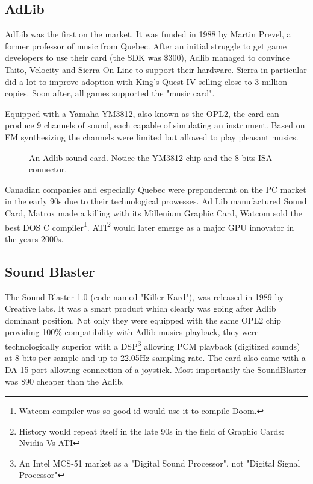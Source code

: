 \documentclass[book.tex]{subfiles}
\begin{document}
  \subsection{AdLib}
  AdLib was the first on the market. It was funded in 1988 by Martin Prevel, a former professor of music from Quebec. After an initial struggle to get game developers to use their card (the SDK was \$300), Adlib managed to convince Taito, Velocity and Sierra On-Line to support their hardware. Sierra in particular did a lot to improve adoption with King's Quest IV selling close to 3 million copies. Soon after, all games supported the "music card".\\
  \par
   Equipped with a Yamaha YM3812, also known as the OPL2, the card can produce 9 channels of sound, each capable of simulating an instrument. Based on FM synthesizing the channels were limited but allowed to play pleasant musics.\\
  \begin{figure}[H] 
    \centering 
    \caption{An Adlib sound card. Notice the YM3812 chip and the 8 bits ISA connector.}
  \end{figure}
   
\par
{} Canadian companies and especially Quebec were preponderant on the PC market in the early 90s due to their technological prowesses. Ad Lib manufactured Sound Card, Matrox made a killing with its Millenium Graphic Card, Watcom sold the best DOS C compiler\footnote{Watcom compiler was so good id would use it to compile Doom.}. ATI\footnote{History would repeat itself in the late 90s in the field of Graphic Cards: Nvidia Vs ATI} would later emerge as a major GPU innovator in the years 2000s.\\
  
  


  \subsection{Sound Blaster}
  The Sound Blaster 1.0 (code named "Killer Kard"), was released in 1989 by Creative labs. It was a smart product which clearly was going after Adlib dominant position. Not only they were equipped with the same OPL2 chip providing 100\% compatibility with Adlib musics playback, they were technologically superior with a DSP\footnote{An Intel MCS-51 market as a "Digital Sound Processor", not "Digital Signal Processor"}  allowing PCM playback (digitized sounds) at 8 bits per sample and up to 22.05Hz sampling rate. The card also came with a DA-15 port allowing connection of a joystick. Most importantly the SoundBlaster was \$90 cheaper than the Adlib.\\ 
\par
\end{document}
